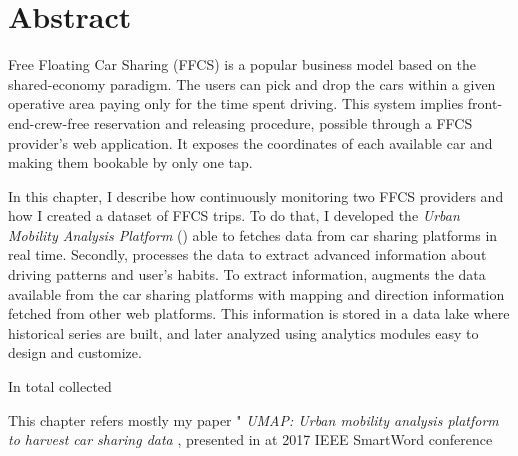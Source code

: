 \section{Abstract}
Free Floating Car Sharing (FFCS) is a popular business model based on the shared-economy paradigm. The users can pick and drop the cars within a given operative area paying only for the time spent driving. This system implies front-end-crew-free reservation and releasing procedure, possible through a FFCS provider's web application. It exposes the coordinates of each available car and making them bookable by only one tap.

In this chapter, I describe how continuously monitoring two FFCS providers and how I created a dataset of FFCS trips. To do that,  I developed the \textit{Urban Mobility Analysis Platform} (\tool) able to fetches data from car sharing platforms in real time. Secondly, \tool processes the data to extract advanced information about driving patterns and user's habits. To extract information, \tool augments the data available from the car sharing platforms with mapping and direction information fetched from other web platforms. This information is stored in a data lake where historical series are built, and later analyzed using analytics modules easy to design and customize. 

In total \tool collected 

This chapter refers mostly my paper " \textit{UMAP: Urban mobility analysis platform to harvest car sharing data} \cite{ciociolaumap}, presented in at 2017 IEEE SmartWord conference


